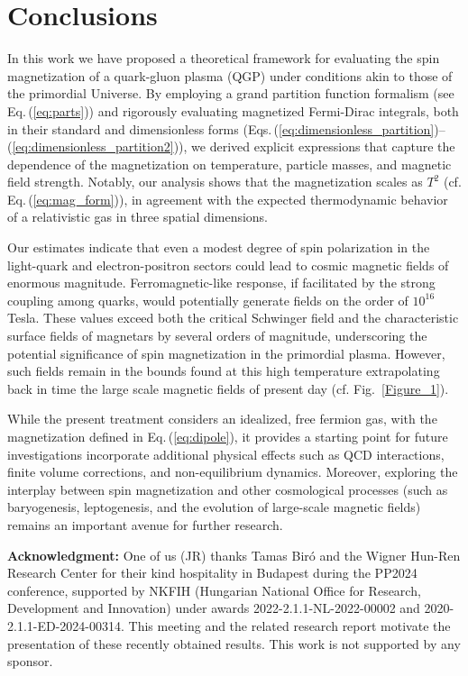 \documentclass[epjST]{svjour}
\newcommand{\req}[1]{Eq.\,(\ref{#1})}
\begin{document}
\section{Conclusions}
\label{sec:conclusions}
In this work we have proposed a theoretical framework for evaluating the spin magnetization of a quark-gluon plasma (QGP) under conditions akin to those of the primordial Universe. By employing a grand partition function formalism (see \req{eq:parts}) and rigorously evaluating magnetized Fermi-Dirac integrals, both in their standard and dimensionless forms (Eqs.\,(\ref{eq:dimensionless_partition})--(\ref{eq:dimensionless_partition2})), we derived explicit expressions that capture the dependence of the magnetization on temperature, particle masses, and magnetic field strength. Notably, our analysis shows that the magnetization scales as \(T^2\) (cf. \req{eq:mag_form}), in agreement with the expected thermodynamic behavior of a relativistic gas in three spatial dimensions.

Our estimates indicate that even a modest degree of spin polarization in the light-quark and electron-positron sectors could lead to cosmic magnetic fields of enormous magnitude. Ferromagnetic-like response, if facilitated by the strong coupling among quarks, would potentially generate fields on the order of \(10^{16}\) Tesla. These values exceed both the critical Schwinger field and the characteristic surface fields of magnetars by several orders of magnitude, underscoring the potential significance of spin magnetization in the primordial plasma. However, such fields remain in the bounds found at this high temperature extrapolating back in time the large scale magnetic fields of present day (cf. Fig.~\ref{Figure_1}).

While the present treatment considers an idealized, free fermion gas, with the magnetization defined in \req{eq:dipole}, it provides a starting point for future investigations incorporate additional physical effects such as QCD interactions, finite volume corrections, and non-equilibrium dynamics. Moreover, exploring the interplay between spin magnetization and other cosmological processes (such as baryogenesis, leptogenesis, and the evolution of large-scale magnetic fields) remains an important avenue for further research.

\textbf{Acknowledgment:} 
One of us (JR) thanks Tamas Bir\'o and the Wigner Hun-Ren Research Center for their kind hospitality in Budapest during the PP2024 conference, supported by NKFIH (Hungarian National Office for Research, Development and Innovation) under awards 2022-2.1.1-NL-2022-00002 and 2020-2.1.1-ED-2024-00314. This meeting and the related research report motivate the presentation of these recently obtained results. This work is not supported by any sponsor.



\end{document}
